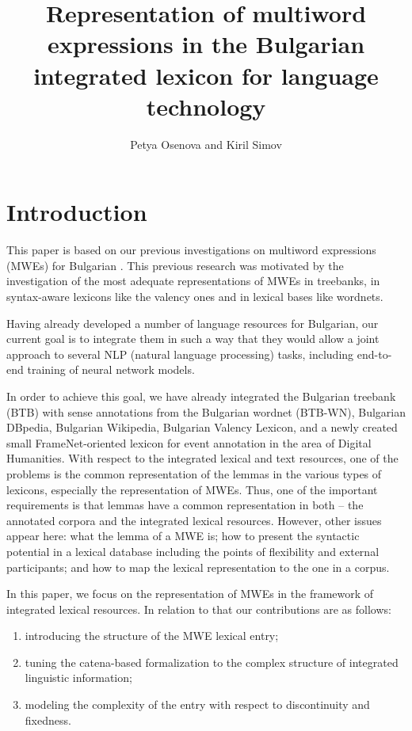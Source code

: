\documentclass[output=paper,colorlinks,citecolor=brown]{langscibook}
\title[Representation of multiword expressions in Bulgarian]{Representation of multiword expressions in the Bulgarian integrated lexicon for language technology}
\author{
Petya Osenova\orcid{0000-0002-4484-5027}\affiliation{Institute of Information and Communication Technologies, Bulgarian Academy of Sciences} and 
Kiril Simov\orcid{0000-0003-3555-0179}\affiliation{Institute of Information and Communication Technologies, Bulgarian Academy of Sciences}
}
\begin{document}
\maketitle

\section{Introduction} 
This paper is based on our previous investigations on multiword expressions (MWEs) for Bulgarian \citep{simov-osenova-2015-catena, laskova-etal-2019-modeling}. 
This previous research was motivated by the investigation of the most adequate representations of MWEs in treebanks, in syntax-aware lexicons like the valency ones and in lexical bases like wordnets. 

Having already developed a number of language resources for Bulgarian, our current goal is to integrate them in such a way that they would allow a joint approach to several NLP (natural language processing) tasks, including end-to-end training of neural network models.

In order to achieve this goal, we have already integrated the Bulgarian treebank (BTB) with sense annotations from the Bulgarian wordnet (BTB-WN), Bulgarian DBpedia, Bulgarian Wikipedia, Bulgarian Valency Lexicon, and a newly created small FrameNet-oriented lexicon for event annotation in the area of Digital Humanities. With respect to the integrated lexical and text resources, one of the problems is the  common representation of the lemmas in the various types of lexicons, especially the representation of MWEs. Thus, one of the important requirements is that lemmas have a common representation in both -- the annotated corpora and the integrated lexical resources. However, other issues appear here: what the lemma of a MWE is; how to present the syntactic potential in a lexical database including the points of flexibility and external participants; and how to map the lexical representation to the one in a corpus.

In this paper, we focus on the representation of MWEs in the framework of integrated lexical resources. In relation to that our contributions are as follows:

\begin{enumerate}
    \item introducing the structure of the MWE lexical entry;
    \item tuning the catena-based formalization to the complex structure of integrated linguistic information;
    \item modeling the complexity of the entry with respect to discontinuity and fixedness.
\end{enumerate}
\end{document}
